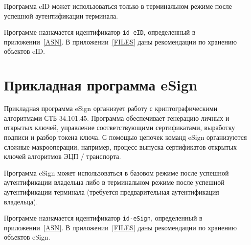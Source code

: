 Программа eID может использоваться только в терминальном режиме
после успешной аутентификации терминала. 

Программе назначается идентификатор \verb|id-eID|, 
определенный в приложении~\ref{ASN}. В приложении~\ref{FILES}
даны рекомендации по хранению объектов eID.

\section{Прикладная программа eSign}\label{OBJ.eSign}

Прикладная программа eSign организует работу с криптографическими 
алгоритмами СТБ 34.101.45. 
%
Программа обеспечивает генерацию личных и открытых 
ключей, управление соответствующими сертификатами, 
выработку подписи и разбор токена ключа.
%
С помощью цепочек команд eSign организуются сложные макрооперации, например, 
процесс выпуска сертификатов открытых ключей алгоритмов ЭЦП / транспорта.

Программа eSign может использоваться в базовом режиме 
после успешной аутентификации владельца либо в терминальном режиме 
после успешной аутентификации терминала (требуется предварительная 
аутентификация владельца). 

Программе назначается идентификатор \verb|id-eSign|, 
определенный в приложении~\ref{ASN}. В приложении~\ref{FILES}
даны рекомендации по хранению объектов eSign.


